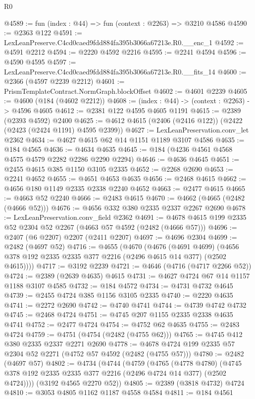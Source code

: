 \begin{lexlean}{R0}
\begin{coremodule}
@4589 := fun (index : @44) => fun (context : @2263) => @3210 @4586
@4590 := @2363 @122
@4591 := LexLeanPreserve.C4cd0caed9fdd884fa395b3066a67213e.R0.__enc_1
@4592 := @4591 @2212
@4594 := @2220 @4592 @2216
@4595 := @2241 @4594
@4596 := @4590 @4595
@4597 := LexLeanPreserve.C4cd0caed9fdd884fa395b3066a67213e.R0.__fits_14
@4600 := @2366 (@4597 @2239 @2212)
@4601 := PrismTemplateContract.NormGraph.blockOffset
@4602 := @4601 @2239
@4605 := @4600 (@184 (@4602 @2212))
@4608 := (index : @44) -> (context : @2263) -> @4596 @4605
@4612 := @2381 @122 @4595 @4605 @1191
@4615 := @2389 (@2393 @4592) @2400
@4625 := @4612 @4615 (@2406 (@2416 @122)) (@2422 (@2423 (@2424 @1191) @4595 @2399))
@4627 := LexLeanPreservation.conv_let @2362
@4634 := @4627 @4615 @62 @14 @1151 @1189 @3107 @4586
@4635 := @184 @4565
@4636 := @4634 @4635
@4645 := @184 (@4236 @4561 @4568 @4575 @4579 @2282 @2286 @2290 @2294)
@4646 := @4636 @4645
@4651 := @2455 @4615 @385 @1150 @3105 @2335
@4652 := @2268 @2690
@4653 := @2241 @4652
@4655 := @4651 @4653 @4635
@4656 := @2468 @4615
@4662 := @4656 @180 @1149 @2335 @2338 @2240 @4652
@4663 := @2477 @4615
@4665 := @4663 @52 @2240
@4666 := @2483 @4615
@4670 := @4662 (@4665 (@2482 (@4666 @52)))
@4676 := @4656 @332 @380 @2335 @2337 @2267 @2690
@4678 := LexLeanPreservation.conv_field @2362
@4691 := @4678 @4615 @199 @2335 @52 @2304 @52 @2267 (@4663 @57 @4592 (@2482 (@4666 @57)))
@4696 := @2407 (@6 @2207) @2207 (@2411 @2207)
@4697 := @4696 @2304
@4699 := @2482 (@4697 @52)
@4716 := @4655
    (@4670
      (@4676
        (@4691 @4699)
        (@4656 @378 @192 @2335 @2335 @377 @2216 (@2496 @4615 @14 @377) (@2502 @4615))))
@4717 := @3192 @2239
@4721 := @4646 (@4716 (@4717 @2266 @52))
@4724 := @2389 (@2639 @4635) @4615
@4731 := @4627 @4724 @67 @14 @1157 @1188 @3107 @4585
@4732 := @184 @4572
@4734 := @4731 @4732 @4645
@4739 := @2455 @4724 @385 @1156 @3105 @2335
@4740 := @2220 @4635
@4741 := @2272 @2690
@4742 := @4740 @4741
@4744 := @4739 @4742 @4732
@4745 := @2468 @4724
@4751 := @4745 @207 @1155 @2335 @2338 @4635 @4741
@4752 := @2477 @4724
@4754 := @4752 @62 @4635
@4755 := @2483 @4724
@4759 := @4751 (@4754 (@2482 (@4755 @62)))
@4765 := @4745 @412 @380 @2335 @2337 @2271 @2690
@4778 := @4678 @4724 @199 @2335 @57 @2304 @52 @2271 (@4752 @57 @4592 (@2482 (@4755 @57)))
@4780 := @2482 (@4697 @57)
@4802 := @4734
    (@4744
      (@4759
        (@4765
          (@4778 @4780)
          (@4745 @378 @192 @2335 @2335 @377 @2216 (@2496 @4724 @14 @377) (@2502 @4724))))
      (@3192 @4565 @2270 @52))
@4805 := @2389 (@3818 @4732) @4724
@4810 := @3053 @4805 @1162 @1187 @4558 @4584
@4811 := @184 @4561

\end{coremodule}
\end{lexlean}
